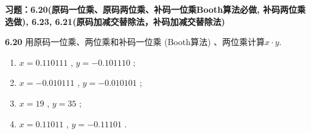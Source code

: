 \documentclass[UTF8]{report}
\newcommand{\problem}[1]{{\setlength{\parskip}{10pt}\noindent \bf{#1}}}
\begin{document}

\maketitle



\textbf{习题：6.20(原码一位乘、原码两位乘、补码一位乘Booth算法必做, 补码两位乘选做), 6.23, 6.21(原码加减交替除法，补码加减交替除法)}

\problem{6.20} 用原码一位乘、两位乘和补码一位乘 (Booth算法) 、两位乘计算$x·y$.

\begin{enumerate}
    \item $x=  0.110 111$ ,  $y= -0.101 110$ ;
    
    \item $x= -0.010 111$ ,  $y= -0.010 101$ ;
    
    \item $x=  19$        ,  $y=  35$        ;
    
    \item $x=  0.110 11$  ,  $y= -0.111 01$  .
\end{enumerate}
\end{document}
